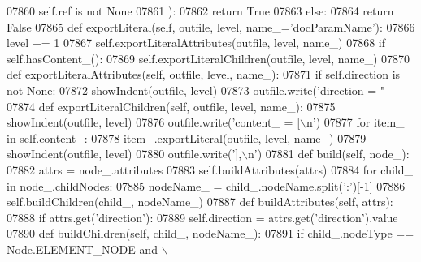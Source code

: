 \begin{DoxyCode}
{{{{{{{{{{{{{{{{{{{{{{{{{{{{{{{{{{{{{{{{{{{{{{{{{{{{{{{{{{{{{{{{{{{{{{{{{{{{{{{{{{{{{{{{{{{{{{{{{{{{{{{{{{{{{{{{{{{{{{{{{{{{{{{{{{{{{{{{{{{{{{{{{{{{{{{{{{{{{{{{{{{{{{{{{{{{{{{{{{{{{{{{{{{{{{{{{{{{{{{{{{{{{{{{{{{{{{{{{{{{{{{{{{{{{{{{{{{{{{{{{{{{{{{{{{{{{{{{{{{{{{{{{{{{{{{{{{{{{{{{{{{{{{{{{{{{{{{{{{{{{{{{{{{{{{{{{{{{{{{{{{{{{{{{{{{{{{{{{{{{{{{{{{{{{{{{{{{{{{{{{{{{{{{{{{{{{{{{{{{{{{{{{{{{{{{{{{{{{{{{{{{{{{{{{{{{{{{{{{{{{{{{{{{{{{{{{{{{{{{{{{{{{{{{{{{{{{{{{{{{{{{{{{{{{{{{{{{{{{{{{{{{{07860             self.ref \textcolor{keywordflow}{is} \textcolor{keywordflow}{not} \textcolor{keywordtype}{None}
07861             ):
07862             \textcolor{keywordflow}{return} \textcolor{keyword}{True}
07863         \textcolor{keywordflow}{else}:
07864             \textcolor{keywordflow}{return} \textcolor{keyword}{False}
07865     \textcolor{keyword}{def }exportLiteral(self, outfile, level, name\_='docParamName'):
07866         level += 1
07867         self.exportLiteralAttributes(outfile, level, name\_)
07868         \textcolor{keywordflow}{if} self.hasContent_():
07869             self.exportLiteralChildren(outfile, level, name\_)
07870     \textcolor{keyword}{def }exportLiteralAttributes(self, outfile, level, name\_):
07871         \textcolor{keywordflow}{if} self.direction \textcolor{keywordflow}{is} \textcolor{keywordflow}{not} \textcolor{keywordtype}{None}:
07872             showIndent(outfile, level)
07873             outfile.write(\textcolor{stringliteral}{'direction = "%
07874     \textcolor{keyword}{def }exportLiteralChildren(self, outfile, level, name\_):
07875         showIndent(outfile, level)
07876         outfile.write(\textcolor{stringliteral}{'content\_ = [\(\backslash\)n'})
07877         \textcolor{keywordflow}{for} item\_ \textcolor{keywordflow}{in} self.content_:
07878             item\_.exportLiteral(outfile, level, name\_)
07879         showIndent(outfile, level)
07880         outfile.write(\textcolor{stringliteral}{'],\(\backslash\)n'})
07881     \textcolor{keyword}{def }build(self, node\_):
07882         attrs = node\_.attributes
07883         self.buildAttributes(attrs)
07884         \textcolor{keywordflow}{for} child\_ \textcolor{keywordflow}{in} node\_.childNodes:
07885             nodeName\_ = child\_.nodeName.split(\textcolor{stringliteral}{':'})[-1]
07886             self.buildChildren(child\_, nodeName\_)
07887     \textcolor{keyword}{def }buildAttributes(self, attrs):
07888         \textcolor{keywordflow}{if} attrs.get(\textcolor{stringliteral}{'direction'}):
07889             self.direction = attrs.get(\textcolor{stringliteral}{'direction'}).value
07890     \textcolor{keyword}{def }buildChildren(self, child\_, nodeName\_):
07891         \textcolor{keywordflow}{if} child\_.nodeType == Node.ELEMENT\_NODE \textcolor{keywordflow}{and} \(\backslash\)
}}}}}}}}}}}}}}}}}}}}}}}}}}}}}}}}}}}}}}}}}}}}}}}}}}}}}}}}}}}}}}}}}}}}}}}}}}}}}}}}}}}}}}}}}}}}}}}}}}}}}}}}}}}}}}}}}}}}}}}}}}}}}}}}}}}}}}}}}}}}}}}}}}}}}}}}}}}}}}}}}}}}}}}}}}}}}}}}}}}}}}}}}}}}}}}}}}}}}}}}}}}}}}}}}}}}}}}}}}}}}}}}}}}}}}}}}}}}}}}}}}}}}}}}}}}}}}}}}}}}}}}}}}}}}}}}}}}}}}}}}}}}}}}}}}}}}}}}}}}}}}}}}}}}}}}}}}}}}}}}}}}}}}}}}}}}}}}}}}}}}}}}}}}}}}}}}}}}}}}}}}}}}}}}}}}}}}}}}}}}}}}}}}}}}}}}}}}}}}}}}}}}}}}}}}}}}}}}}}}}}}}}}}}}}}}}}}}}}}}}}}}}}}}}}}}}}}}}}}}}}}}}}}}}}}}}}}}}}}}}}}}}}}
\end{DoxyCode}
